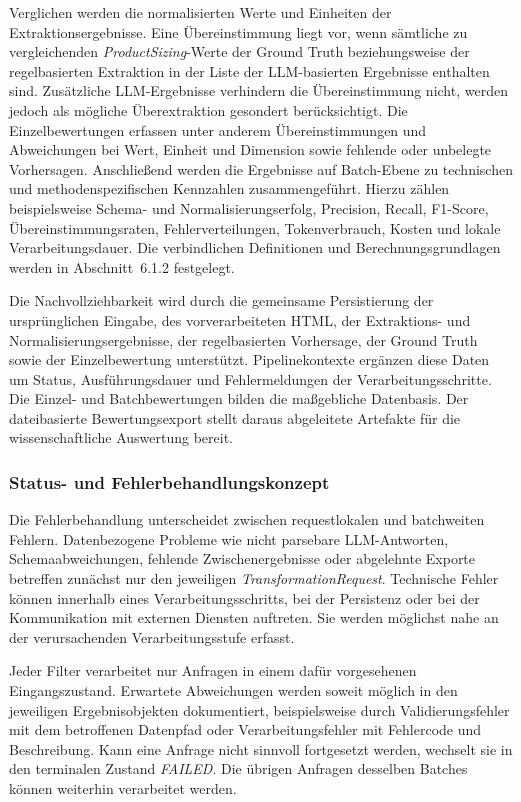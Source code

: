 Verglichen werden die normalisierten Werte und Einheiten der Extraktionsergebnisse. Eine Übereinstimmung liegt vor, wenn sämtliche zu vergleichenden 
\textit{ProductSizing}-Werte der Ground Truth beziehungsweise der regelbasierten Extraktion in der Liste der LLM-basierten Ergebnisse enthalten sind. Zusätzliche 
LLM-Ergebnisse verhindern die Übereinstimmung nicht, werden jedoch als mögliche Überextraktion gesondert berücksichtigt. Die Einzelbewertungen erfassen unter anderem 
Übereinstimmungen und Abweichungen bei Wert, Einheit und Dimension sowie fehlende oder unbelegte Vorhersagen. Anschließend werden die Ergebnisse auf Batch-Ebene zu 
technischen und methodenspezifischen Kennzahlen zusammengeführt. Hierzu zählen beispielsweise Schema- und Normalisierungserfolg, Precision, Recall, F1-Score, 
Übereinstimmungsraten, Fehlerverteilungen, Tokenverbrauch, Kosten und lokale Verarbeitungsdauer. Die verbindlichen Definitionen und Berechnungsgrundlagen werden in 
Abschnitt~6.1.2 festgelegt.

Die Nachvollziehbarkeit wird durch die gemeinsame Persistierung der ursprünglichen Eingabe, des vorverarbeiteten HTML, der Extraktions- und Normalisierungsergebnisse, der 
regelbasierten Vorhersage, der Ground Truth sowie der Einzelbewertung unterstützt. Pipelinekontexte ergänzen diese Daten um Status, Ausführungsdauer und Fehlermeldungen 
der Verarbeitungsschritte. Die Einzel- und Batchbewertungen bilden die maßgebliche Datenbasis. Der dateibasierte Bewertungsexport stellt daraus abgeleitete Artefakte für 
die wissenschaftliche Auswertung bereit.

\subsubsection{Status- und Fehlerbehandlungskonzept}

Die Fehlerbehandlung unterscheidet zwischen requestlokalen und batchweiten Fehlern. Datenbezogene Probleme wie nicht parsebare LLM-Antworten, Schemaabweichungen, fehlende 
Zwischenergebnisse oder abgelehnte Exporte betreffen zunächst nur den jeweiligen \textit{TransformationRequest}. Technische Fehler können innerhalb eines Verarbeitungsschritts, 
bei der Persistenz oder bei der Kommunikation mit externen Diensten auftreten. Sie werden möglichst nahe an der verursachenden Verarbeitungsstufe erfasst.

Jeder Filter verarbeitet nur Anfragen in einem dafür vorgesehenen Eingangszustand. Erwartete Abweichungen werden soweit möglich in den jeweiligen Ergebnisobjekten dokumentiert, 
beispielsweise durch Validierungsfehler mit dem betroffenen Datenpfad oder Verarbeitungsfehler mit Fehlercode und Beschreibung. Kann eine Anfrage nicht sinnvoll fortgesetzt 
werden, wechselt sie in den terminalen Zustand \textit{FAILED}. Die übrigen Anfragen desselben Batches können weiterhin verarbeitet werden.

